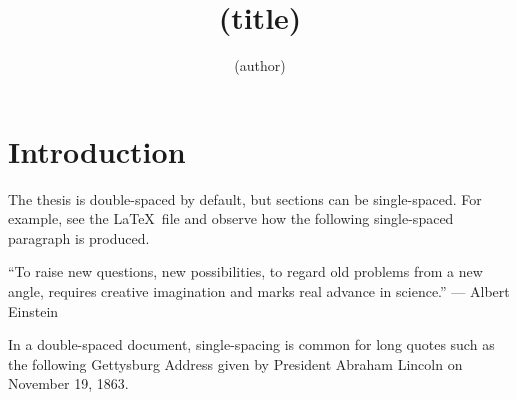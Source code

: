 \documentclass[11pt]{report}
\begin{document}
\title     {(title)}
\author    {(author)}





\beginpreface
{}
\endpreface


\chapter{Introduction}

The thesis is double-spaced by default, but sections can be single-spaced.  For example, see the \LaTeX\ file and observe how the following single-spaced paragraph is produced.

\begin{singlespace}
  ``To raise new questions, new possibilities, to regard old problems from a new angle, requires creative imagination and marks real advance in science.'' --- Albert Einstein
  \end{singlespace}

In a double-spaced document, single-spacing is common for long quotes such as the following Gettysburg Address given by President Abraham Lincoln on November 19, 1863.
\end{document}
